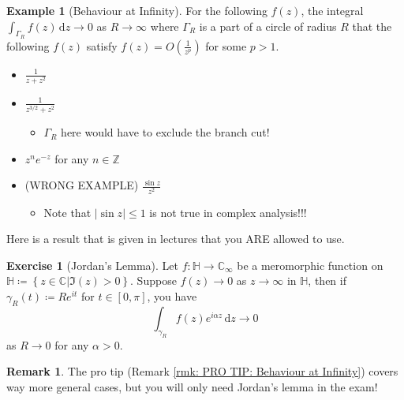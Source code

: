 \documentclass[a4paper, 12pt]{article}
\theoremstyle{definition}
\newtheorem{exercise}{Exercise}
\newtheorem{example}{Example}
\newtheorem{remark}{Remark}
\numberwithin{theorem}{section}
\numberwithin{definition}{section}
\numberwithin{exercise}{section}
\numberwithin{remark}{section}
\numberwithin{figure}{section}
\numberwithin{example}{section}
\newcommand{\C}{\mathbb{C}}
\newcommand{\intd}{\,\text{d}}
\begin{document}
\begin{example}[Behaviour at Infinity]
    For the following $f(z)$, the integral $\int_{\Gamma_R} f(z) \intd z \rightarrow 0$ as $R \rightarrow \infty$ where $\Gamma_R$ is a part of a circle of radius $R$
    that the following $f(z)$ satisfy $f(z) = O\left( \frac{1}{z^p} \right)$ for some $p>1$.
    \begin{itemize}
        \item $\frac{1}{z+z^2}$
        \item $\frac{1}{z^{3/2}+z^2}$
            \begin{itemize}
                \item $\Gamma_R$ here would have to exclude the branch cut!
            \end{itemize}
        \item $z^ne^{-z}$ for any $n \in \mathbb{Z}$
        \item (WRONG EXAMPLE) $\frac{\sin{z}}{z^2}$
            \begin{itemize}
                \item Note that $|\sin{z}| \leq 1$ is not true in complex analysis!!!
            \end{itemize}
    \end{itemize}
\end{example}

Here is a result that is given in lectures that you ARE allowed to use.
\begin{exercise}[Jordan's Lemma]
    \label{ex: Jordan's Lemma}
    Let $f:\mathbb{H} \rightarrow \C_{\infty}$ be a meromorphic function on
    $\mathbb{H} \coloneqq \left\{ z \in \C | \Im{(z)} > 0 \right\}$.
    Suppose $f(z) \rightarrow 0$ as $z \rightarrow \infty$ in $\mathbb{H}$,
    then if $\gamma_R (t) \coloneqq R e^{it}$ for $t \in \left[ 0, \pi \right]$,
    you have
    \begin{equation*}
        \int_{\gamma_R} f(z) e^{i \alpha z} \intd z \rightarrow 0
    \end{equation*}
    as $R \rightarrow 0$ for any $\alpha > 0$.
\end{exercise}
\begin{remark}
    The pro tip (Remark \ref{rmk: PRO TIP: Behaviour at Infinity})
    covers way more general cases, but you will only need Jordan's lemma in the exam!
\end{remark}
\end{document}
